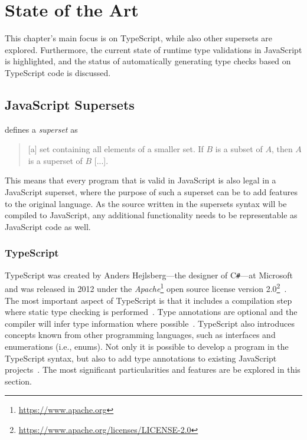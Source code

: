 \chapter{State of the Art}
\label{cha:state-of-the-art}

This chapter's main focus is on TypeScript, while also other supersets are explored. Furthermore, the current state of runtime type validations in JavaScript is highlighted, and the status of automatically generating type checks based on TypeScript code is discussed.

\section{JavaScript Supersets}
\label{sec:supersets}

\citeauthor{Term:Superset} defines a \emph{superset} as 
\begin{quote}
   [a] set containing all elements of a smaller set. If $B$ is a subset of $A$, then $A$ is a superset of $B$ [...].~\cite{Term:Superset}
\end{quote}
This means that every program that is valid in JavaScript is also legal in a JavaScript superset, where the purpose of such a superset can be to add features to the original language. As the source written in the supersets syntax will be compiled to JavaScript, any additional functionality needs to be representable as JavaScript code as well.

\subsection{TypeScript}
\label{sec:typescript}

TypeScript was created by Anders Hejlsberg---the designer of C\texttt{\#}---at Microsoft~\cite[p.~10]{MasteringTypeScript:Rozentals:2017} and was released in 2012 under the \emph{Apache}\footnote{\url{https://www.apache.org}} open source license version 2.0\footnote{\url{https://www.apache.org/licenses/LICENSE-2.0}}~\cite[p.~xix]{ProTypeScript:Fenton:2014}. The most important aspect of TypeScript is that it includes a compilation step where static type checking is performed~\cite[p.~11]{MasteringTypeScript:Rozentals:2017}. Type annotations are optional and the compiler will infer type information where possible~\cite[p.~10]{TypeScriptBook:Syed:2017}. TypeScript also introduces concepts known from other programming languages, such as interfaces and enumerations (i.e., enums). Not only it is possible to develop a program in the TypeScript syntax, but also to add type annotations to existing JavaScript projects~\cite[p.~13]{MasteringTypeScript:Rozentals:2017}. The most significant particularities and features are be explored in this section.

